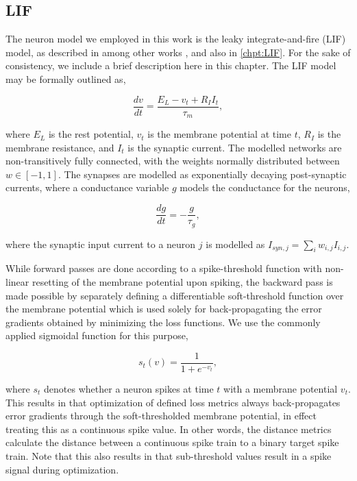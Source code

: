 \documentclass[mphil,deptreport,ianc]{infthesis} %
\begin{document}
\subsection{LIF}


The neuron model we employed in this work is the leaky integrate-and-fire (LIF) model, as described in among other works \cite{Rolls1998Book}, and also in 
\ref{chpt:LIF}. For the sake of consistency, we include a brief description here in this chapter. The LIF model may be formally outlined as,

\begin{equation}
    \frac{dv}{dt} = \frac{E_L - v_t + R_I I_t}{\tau_m},
\end{equation}

where $E_L$ is the rest potential, $v_t$ is the membrane potential at time $t$, $R_I$ is the membrane resistance, and $I_t$ is the synaptic current.
The modelled networks are non-transitively fully connected, with the weights normally distributed between $w \in [-1, 1]$. The synapses are modelled as exponentially decaying post-synaptic currents, where a conductance variable $g$ models the conductance for the neurons,

\begin{equation}
    \frac{dg}{dt} = -\frac{g}{\tau_g},
\end{equation}

where the synaptic input current to a neuron $j$ is modelled as $I_{syn,j} = \sum_{i} w_{i,j} I_{i,j}$.

While forward passes are done according to a spike-threshold function with non-linear resetting of the membrane potential upon spiking, the backward pass is made possible by separately defining a differentiable soft-threshold function over the membrane potential which is used solely for back-propagating the error gradients obtained by minimizing the loss functions. We use the commonly applied sigmoidal function for this purpose,

\begin{equation}
    s_t(v) = \frac{1}{1+e^{-v_t}},
\end{equation}

where $s_t$ denotes whether a neuron spikes at time $t$ with a membrane potential $v_t$.
This results in that optimization of defined loss metrics always back-propagates error gradients through the soft-thresholded membrane potential, in effect treating this as a continuous spike value. 
In other words, the distance metrics calculate the distance between a continuous spike train to a binary target spike train.
Note that this also results in that sub-threshold values result in a spike signal during optimization.
\end{document}
